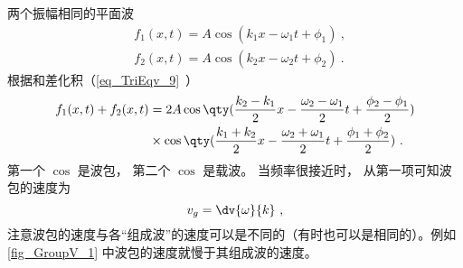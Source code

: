 两个振幅相同的平面波
\begin{equation}
\begin{aligned}
&f_1(x,t) = A\cos(k_1 x - \omega_1 t + \phi_1)~,\\
&f_2(x,t) = A\cos(k_2 x - \omega_2 t + \phi_2)~.
\end{aligned}
\end{equation}
根据和差化积（\autoref{eq_TriEqv_9}~）
\begin{equation}
\begin{aligned}
f_1(x,t) + f_2(x,t) &= 2 A \cos \qty(\frac{k_2-k_1}{2}x - \frac{\omega_2-\omega_1}{2}t + \frac{\phi_2 - \phi_1}{2})\\
& \times \cos \qty(\frac{k_1+k_2}{2}x - \frac{\omega_{2}+\omega_{1}}{2}t + \frac{\phi_1 + \phi_2}{2})~.
\end{aligned}
\end{equation}
第一个 $\cos$ 是波包， 第二个 $\cos$ 是载波。 当频率很接近时， 从第一项可知波包的速度为
\begin{equation}
v_g = \dv{\omega}{k}~,
\end{equation}
注意波包的速度与各“组成波”的速度可以是不同的（有时也可以是相同的）。例如\autoref{fig_GroupV_1} 中波包的速度就慢于其组成波的速度。
